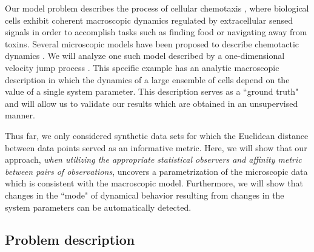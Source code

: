 \documentclass[3p]{elsarticle}
\begin{document}
Our model problem describes the process of cellular chemotaxis \cite{othmer2000diffusion}, 
where biological cells exhibit coherent macroscopic dynamics regulated by extracellular sensed signals 
in order to accomplish tasks such as finding food or navigating away from toxins.
%
Several microscopic models have been proposed to describe chemotactic dynamics \cite{othmer1988models, codling2008random}.
%
We will analyze one such model described by a one-dimensional velocity jump process \cite{othmer2000diffusion}.
%
This specific example has an analytic macroscopic description in which the 
dynamics of a large ensemble of cells depend on the value of a single system parameter.
%
This description serves as a ``ground truth" and will allow us to validate our results which are obtained in an unsupervised manner.

Thus far, we only considered synthetic data sets for which the Euclidean distance between data points served as an informative metric.
%
Here, we will show that our approach, {\em when utilizing the appropriate statistical observers and affinity metric between pairs of observations}, 
uncovers a parametrization of the microscopic data which is consistent with the macroscopic model.
%
Furthermore, we will show that changes in the ``mode" of dynamical behavior resulting from changes in the system parameters can be automatically detected.

\subsection{Problem description}
\end{document}
